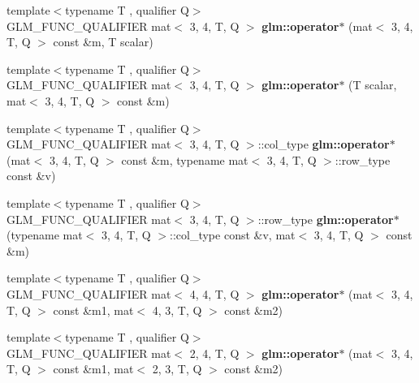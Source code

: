 \begin{DoxyCompactItemize}
\item 
\mbox{\label{type__mat3x4_8inl_a09af414dfec8e5eff15027c861c97c60}} 
{\footnotesize template$<$typename T , qualifier Q$>$ }\\G\+L\+M\+\_\+\+F\+U\+N\+C\+\_\+\+Q\+U\+A\+L\+I\+F\+I\+ER mat$<$ 3, 4, T, Q $>$ {\bfseries glm\+::operator$\ast$} (mat$<$ 3, 4, T, Q $>$ const \&m, T scalar)
\item 
\mbox{\label{type__mat3x4_8inl_ab4a2084b36d4588ff869ed7c747f3c0a}} 
{\footnotesize template$<$typename T , qualifier Q$>$ }\\G\+L\+M\+\_\+\+F\+U\+N\+C\+\_\+\+Q\+U\+A\+L\+I\+F\+I\+ER mat$<$ 3, 4, T, Q $>$ {\bfseries glm\+::operator$\ast$} (T scalar, mat$<$ 3, 4, T, Q $>$ const \&m)
\item 
\mbox{\label{type__mat3x4_8inl_abd71409fec017293b28bad82e4352e4a}} 
{\footnotesize template$<$typename T , qualifier Q$>$ }\\G\+L\+M\+\_\+\+F\+U\+N\+C\+\_\+\+Q\+U\+A\+L\+I\+F\+I\+ER mat$<$ 3, 4, T, Q $>$\+::col\+\_\+type {\bfseries glm\+::operator$\ast$} (mat$<$ 3, 4, T, Q $>$ const \&m, typename mat$<$ 3, 4, T, Q $>$\+::row\+\_\+type const \&v)
\item 
\mbox{\label{type__mat3x4_8inl_a34ecb8c2c0525e10d9d1c0bbf8e2e1f3}} 
{\footnotesize template$<$typename T , qualifier Q$>$ }\\G\+L\+M\+\_\+\+F\+U\+N\+C\+\_\+\+Q\+U\+A\+L\+I\+F\+I\+ER mat$<$ 3, 4, T, Q $>$\+::row\+\_\+type {\bfseries glm\+::operator$\ast$} (typename mat$<$ 3, 4, T, Q $>$\+::col\+\_\+type const \&v, mat$<$ 3, 4, T, Q $>$ const \&m)
\item 
\mbox{\label{type__mat3x4_8inl_a8cf5a419af6088f7e2ef9f05509e0acb}} 
{\footnotesize template$<$typename T , qualifier Q$>$ }\\G\+L\+M\+\_\+\+F\+U\+N\+C\+\_\+\+Q\+U\+A\+L\+I\+F\+I\+ER mat$<$ 4, 4, T, Q $>$ {\bfseries glm\+::operator$\ast$} (mat$<$ 3, 4, T, Q $>$ const \&m1, mat$<$ 4, 3, T, Q $>$ const \&m2)
\item 
\mbox{\label{type__mat3x4_8inl_a3e4a88d6df1e21560800d7dd5ccd471c}} 
{\footnotesize template$<$typename T , qualifier Q$>$ }\\G\+L\+M\+\_\+\+F\+U\+N\+C\+\_\+\+Q\+U\+A\+L\+I\+F\+I\+ER mat$<$ 2, 4, T, Q $>$ {\bfseries glm\+::operator$\ast$} (mat$<$ 3, 4, T, Q $>$ const \&m1, mat$<$ 2, 3, T, Q $>$ const \&m2)

\end{DoxyCompactItemize}
